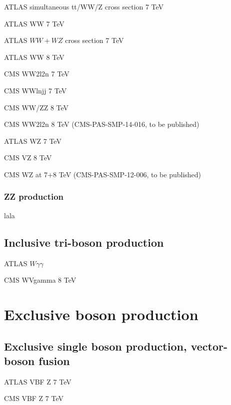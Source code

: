 \documentclass[12pt]{iopart}
\begin{document}
ATLAS simultaneous tt/WW/Z cross section 7 TeV~\cite{Aad:2014jra}

ATLAS WW 7 TeV~\cite{ATLAS:2012mec}

ATLAS $WW+WZ$ cross section 7 TeV~\cite{Aad:2014mda}

ATLAS WW 8 TeV~\cite{ATLAS-CONF-2014-033}

CMS WW2l2n 7 TeV~\cite{Chatrchyan:2013yaa}

CMS WWlnjj 7 TeV~\cite{Chatrchyan:2012bd}

CMS WW/ZZ 8 TeV~\cite{Chatrchyan:2013oev}

CMS WW2l2n 8 TeV (CMS-PAS-SMP-14-016, to be published)


ATLAS WZ 7 TeV~\cite{Aad:2012twa}

CMS VZ 8 TeV~\cite{Chatrchyan:2014aqa}

CMS WZ at 7+8 TeV (CMS-PAS-SMP-12-006, to be published)

\subsubsection{ZZ production}
\label{sss-ZZprod}

lala







\subsection{Inclusive tri-boson production}

ATLAS $W\gamma\gamma$~\cite{Aad:2015uqa}

CMS WVgamma 8 TeV~\cite{Chatrchyan:2014bza}

\section{Exclusive boson production}
\subsection{Exclusive single boson production, vector-boson fusion}

ATLAS VBF Z 7 TeV~\cite{Aad:2014dta}

CMS VBF Z 7 TeV~\cite{Chatrchyan:2013jya}
\end{document}
